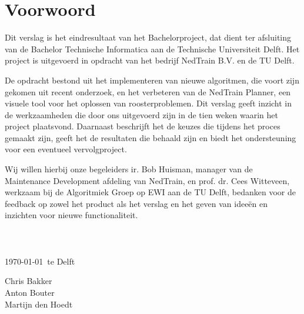 \section*{Voorwoord}
Dit verslag is het eindresultaat van het Bachelorproject, dat dient ter afsluiting van de Bachelor Technische Informatica aan de Technische Universiteit Delft. Het project is uitgevoerd in opdracht van het bedrijf NedTrain B.V. en de TU Delft.

De opdracht bestond uit het implementeren van nieuwe algoritmen, die voort zijn gekomen uit recent onderzoek, en het verbeteren van de NedTrain Planner, een visuele tool voor het oplossen van roosterproblemen. Dit verslag geeft inzicht in de werkzaamheden die door ons uitgevoerd zijn in de tien weken waarin het project plaatsvond. Daarnaast beschrijft het de keuzes die tijdens het proces gemaakt zijn, geeft het de resultaten die behaald zijn en biedt het ondersteuning voor een eventueel vervolgproject.

Wij willen hierbij onze begeleiders ir. Bob Huisman, manager van de Maintenance Development afdeling van NedTrain, en prof. dr. Cees Witteveen, werkzaam bij de Algoritmiek Groep op EWI aan de TU Delft, bedanken voor de feedback op zowel het product als het verslag en het geven van idee\"en en inzichten voor nieuwe functionaliteit. 
\\ \\ \\ \\
\today ~te Delft

Chris Bakker \\
Anton Bouter \\
Martijn den Hoedt

